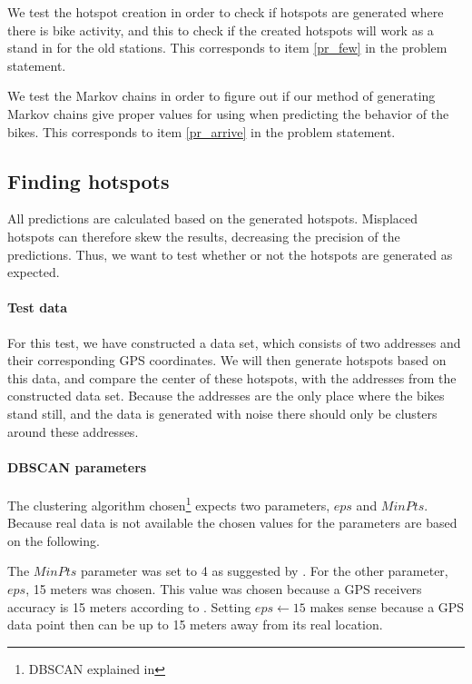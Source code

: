 We test the hotspot creation in order to check if hotspots are generated where there is bike activity, and this to check if the created hotspots will work as a stand in for the old stations.
This corresponds to item \ref{pr_few} in the problem statement.

We test the Markov chains in order to figure out if our method of generating Markov chains give proper values for using when predicting the behavior of the bikes.
This corresponds to item \ref{pr_arrive} in the problem statement.

\subsection{Finding hotspots}
All predictions are calculated based on the generated hotspots.
Misplaced hotspots can therefore skew the results, decreasing the precision of the predictions.
Thus, we want to test whether or not the hotspots are generated as expected.

\paragraph{Test data}
For this test, we have constructed a data set, which consists of two addresses and their corresponding GPS coordinates.
We will then generate hotspots based on this data, and compare the center of these hotspots, with the addresses from the constructed data set.
Because the addresses are the only place where the bikes stand still, and the data is generated with noise there should only be clusters around these addresses.

\paragraph{DBSCAN parameters}
The clustering algorithm chosen\footnote{DBSCAN explained in } expects two parameters, $eps$ and $MinPts$.
Because real data is not available the chosen values for the parameters are based on the following.

The $MinPts$ parameter was set to 4 as suggested by \citet[Page 529]{pang2006introduction}.
For the other parameter, $eps$, 15 meters was chosen.
This value was chosen because a GPS receivers accuracy is 15 meters according to \citet{garmingps}.
Setting $eps \leftarrow 15$ makes sense because a GPS data point then can be up to 15 meters away from its real location.

